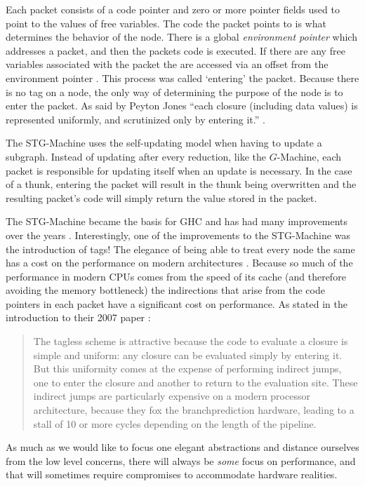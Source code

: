     Each packet consists of a code pointer and zero or more pointer fields used
to point to the values of free variables. The code the packet points to is what
determines the behavior of the node. There is a global \emph{environment
pointer} which addresses a packet, and then the packets code is executed. If
there are any free variables associated with the packet the are accessed via an
offset from the environment pointer \cite{jones1992implementing}. This process
was called `entering' the packet. Because there is no tag on a node, the only
way of determining the purpose of the node is to enter the packet. As said by
Peyton Jones ``each closure (including data values) is represented uniformly,
and scrutinized only by entering it.'' \cite{jones1992implementing}. 

    The STG-Machine uses the self-updating model when having to update a
subgraph. Instead of updating after every reduction, like the $G$-Machine, each
packet is responsible for updating itself when an update is necessary. In the
case of a thunk, entering the packet will result in the thunk being overwritten
and the resulting packet's code will simply return the value stored in the
packet. 

    The STG-Machine became the basis for GHC and has had many improvements over
the years \cite{HistoryOfHaskell}. Interestingly, one of the improvements to the
STG-Machine was the introduction of tags! The elegance of being able to treat
every node the same has a cost on the performance on modern architectures
\cite{marlow2007faster}.
Because so much of the performance in modern CPUs comes from the speed of its
cache (and therefore avoiding the memory bottleneck) the indirections that arise
from the code pointers in each packet have a significant cost on performance. As
stated in the introduction to their 2007 paper \cite{marlow2007faster}:
\begin{quote}
The tagless scheme is attractive because the code to evaluate a closure is
simple and uniform: any closure can be evaluated simply by
entering it. But this uniformity comes at the expense of performing indirect
jumps, one to enter the closure and another to return to
the evaluation site. These indirect jumps are particularly expensive
on a modern processor architecture, because they fox the branchprediction
hardware, leading to a stall of 10 or more cycles depending on the length of the
pipeline. 
\end{quote}

As much as we would like to focus one elegant abstractions and distance
ourselves from the low level concerns, there will always be \emph{some} focus on
performance, and that will sometimes require compromises to accommodate hardware
realities. 

